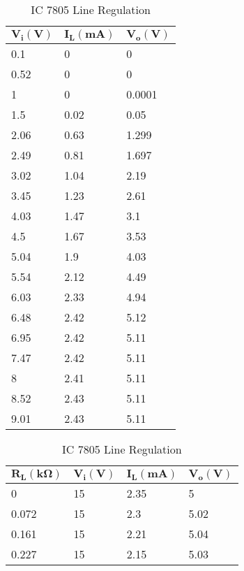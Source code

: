\documentclass{scrartcl}
\newcommand{\1}{\mathbbm{1}}
\begin{document}
\begin{itemize}
\begin{table}[!htb]
	\centering
    \begin{minipage}{.35\linewidth}
		\centering
    \begin{tabular}{|l|l|l|}
    \hline
        $\pmb{V_i (V)}$ & $\pmb{I_L (mA)}$ & $\pmb{V_o (V)}$ \\ \hline
        0.1 & 0 & 0 \\ \hline
        0.52 & 0 & 0 \\ \hline
        1 & 0 & 0.0001 \\ \hline
        1.5 & 0.02 & 0.05 \\ \hline
        2.06 & 0.63 & 1.299 \\ \hline
        2.49 & 0.81 & 1.697 \\ \hline
        3.02 & 1.04 & 2.19 \\ \hline
        3.45 & 1.23 & 2.61 \\ \hline
        4.03 & 1.47 & 3.1 \\ \hline
        4.5 & 1.67 & 3.53 \\ \hline
        5.04 & 1.9 & 4.03 \\ \hline
        5.54 & 2.12 & 4.49 \\ \hline
        6.03 & 2.33 & 4.94 \\ \hline
        6.48 & 2.42 & 5.12 \\ \hline
        6.95 & 2.42 & 5.11 \\ \hline
        7.47 & 2.42 & 5.11 \\ \hline
        8 & 2.41 & 5.11 \\ \hline
        8.52 & 2.43 & 5.11 \\ \hline
        9.01 & 2.43 & 5.11 \\ \hline
    \end{tabular}
    \caption{IC 7805 Line Regulation}
	\label{tab:icline}
    \end{minipage}%
    \begin{minipage}{.45\linewidth}
		\centering
    \begin{tabular}{|l|l|l|l|}
    \hline
        $\pmb{R_L (k \Omega)}$ & $\pmb{V_i (V)}$ & $\pmb{I_L (mA)}$ & $\pmb{V_o (V)}$ \\ \hline
        0 & 15 & 2.35 & 5 \\ \hline
        0.072 & 15 & 2.3 & 5.02 \\ \hline
        0.161 & 15 & 2.21 & 5.04 \\ \hline
        0.227 & 15 & 2.15 & 5.03 \\ \hline

\end{tabular}
\end{minipage}
\end{table}
\end{itemize}
\end{document}

